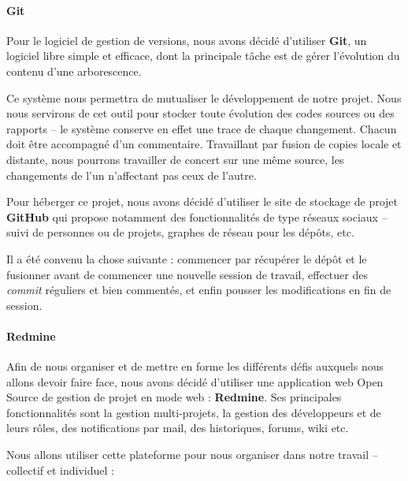 \paragraph*{Git\\}

Pour le logiciel de gestion de versions, nous avons décidé d'utiliser \textbf{Git}, un logiciel libre simple et efficace, dont la principale tâche est de gérer l'évolution du contenu d'une arborescence.


Ce système nous permettra de mutualiser le développement de notre projet. Nous nous servirons de cet outil pour stocker toute évolution des codes sources ou des rapports -- le système conserve en effet une trace de chaque changement. Chacun doit être accompagné d'un commentaire. Travaillant par fusion de copies locale et distante, nous pourrons travailler de concert sur une même source, les changements de l'un n'affectant pas ceux de l'autre.

Pour héberger ce projet, nous avons décidé d'utiliser le site de stockage de projet \textbf{GitHub} qui propose notamment des fonctionnalités de type réseaux sociaux -- suivi de personnes ou de projets, graphes de réseau pour les dépôts, etc.

Il a été convenu la chose suivante : commencer par récupérer le dépôt et le fusionner avant de commencer une nouvelle session de travail, effectuer des \textit{commit} réguliers et bien commentés, et enfin pousser les modifications en fin de session.

\paragraph*{Redmine\\}

Afin de nous organiser et de mettre en forme les différents défis auxquels nous allons devoir faire face, nous avons décidé d'utiliser une application web Open Source de gestion de projet en mode web : \textbf{Redmine}. Ses principales fonctionnalités sont la gestion multi-projets, la gestion des développeurs et de leurs rôles, des notifications par mail, des historiques, forums, wiki etc.

Nous allons utiliser cette plateforme pour nous organiser dans notre travail -- collectif et individuel :

